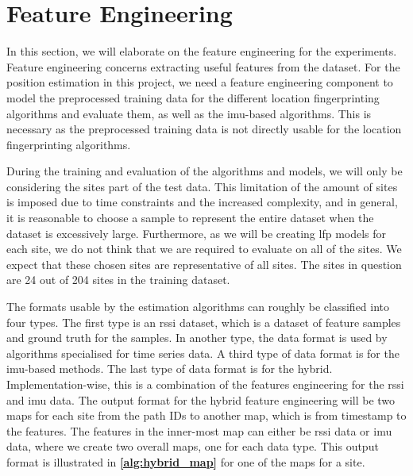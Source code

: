 \section{Feature Engineering}\label{sec:feature_eng}
In this section, we will elaborate on the feature engineering for the experiments. Feature engineering concerns extracting useful features from the dataset.  %
For the position estimation in this project, we need a feature engineering component to model the preprocessed training data for the different location fingerprinting algorithms and evaluate them, as well as the \gls{imu}-based algorithms. This is necessary as the preprocessed training data is not directly usable for the location fingerprinting algorithms. %

During the training and evaluation of the algorithms and models, we will only be considering the sites part of the test data. This limitation of the amount of sites is imposed due to time constraints and the increased complexity, and in general, it is reasonable to choose a sample to represent the entire dataset when the dataset is excessively large. Furthermore, as we will be creating \gls{lfp} models for each site, we do not think that we are required to evaluate on all of the sites. We expect that these chosen sites are representative of all sites. The sites in question are 24 out of 204 sites in the training dataset.

The formats usable by the estimation algorithms can roughly be classified into four types. The first type is an \gls{rssi} dataset, which is a dataset of feature samples and ground truth for the samples. In another type, the data format is used by algorithms specialised for time series data. A third type of data format is for the \gls{imu}-based methods. The last type of data format is for the hybrid. Implementation-wise, this is a combination of the features engineering for the \gls{rssi} and \gls{imu} data. The output format for the hybrid feature engineering will be two maps for each site from the path IDs to another map, which is from timestamp to the features. The features in the inner-most map can either be \gls{rssi} data or \gls{imu} data, where we create two overall maps, one for each data type. This output format is illustrated in \textbf{\autoref{alg:hybrid_map}} for one of the maps for a site.

